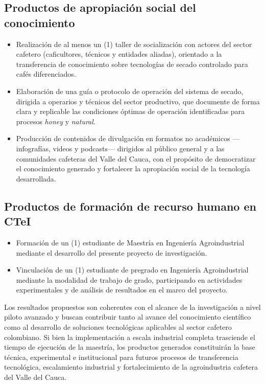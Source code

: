 \subsection{Productos de apropiación social del conocimiento}
\begin{itemize}
    \item Realización de al menos un (1) taller de socialización con actores del sector 
    cafetero (caficultores, técnicos y entidades aliadas), orientado a la transferencia 
    de conocimiento sobre tecnologías de secado controlado para cafés diferenciados.
    \item Elaboración de una guía o protocolo de operación del sistema de secado, 
    dirigida a operarios y técnicos del sector productivo, que documente de forma 
    clara y replicable las condiciones óptimas de operación identificadas para procesos 
    \textit{honey} y \textit{natural}.
    \item Producción de contenidos de divulgación en formatos no académicos —infografías, 
    videos y podcasts— dirigidos al público general y a las comunidades cafeteras del 
    Valle del Cauca, con el propósito de democratizar el conocimiento generado y 
    fortalecer la apropiación social de la tecnología desarrollada.
\end{itemize}

\subsection{Productos de formación de recurso humano en CTeI}
\begin{itemize}
    \item Formación de un (1) estudiante de Maestría en Ingeniería Agroindustrial 
    mediante el desarrollo del presente proyecto de investigación.
    \item Vinculación de un (1) estudiante de pregrado en Ingeniería Agroindustrial 
    mediante la modalidad de trabajo de grado, participando en actividades 
    experimentales y de análisis de resultados en el marco del proyecto.
\end{itemize}

Los resultados propuestos son coherentes con el alcance de la investigación a nivel 
piloto avanzado y buscan contribuir tanto al avance del conocimiento científico como 
al desarrollo de soluciones tecnológicas aplicables al sector cafetero colombiano. 
Si bien la implementación a escala industrial completa trasciende el tiempo de 
ejecución de la maestría, los productos generados constituirán la base técnica, 
experimental e institucional para futuros procesos de transferencia tecnológica, 
escalamiento industrial y fortalecimiento de la agroindustria cafetera del Valle 
del Cauca.